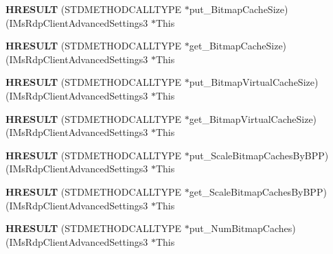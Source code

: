 \begin{DoxyCompactItemize}
{\bfseries H\+R\+E\+S\+U\+LT} (S\+T\+D\+M\+E\+T\+H\+O\+D\+C\+A\+L\+L\+T\+Y\+PE $\ast$put\+\_\+\+Bitmap\+Cache\+Size)(I\+Ms\+Rdp\+Client\+Advanced\+Settings3 $\ast$This
\item 
\mbox{\label{struct_i_ms_rdp_client_advanced_settings3_vtbl_a48b5971f9cb8ebb39366e72e572743e6}} 
{\bfseries H\+R\+E\+S\+U\+LT} (S\+T\+D\+M\+E\+T\+H\+O\+D\+C\+A\+L\+L\+T\+Y\+PE $\ast$get\+\_\+\+Bitmap\+Cache\+Size)(I\+Ms\+Rdp\+Client\+Advanced\+Settings3 $\ast$This
\item 
\mbox{\label{struct_i_ms_rdp_client_advanced_settings3_vtbl_a7ba15eb9a95d8d96d5abe3e9f6d1c70b}} 
{\bfseries H\+R\+E\+S\+U\+LT} (S\+T\+D\+M\+E\+T\+H\+O\+D\+C\+A\+L\+L\+T\+Y\+PE $\ast$put\+\_\+\+Bitmap\+Virtual\+Cache\+Size)(I\+Ms\+Rdp\+Client\+Advanced\+Settings3 $\ast$This
\item 
\mbox{\label{struct_i_ms_rdp_client_advanced_settings3_vtbl_a47dc3fc21077eb0a0d23b28fa47d2a19}} 
{\bfseries H\+R\+E\+S\+U\+LT} (S\+T\+D\+M\+E\+T\+H\+O\+D\+C\+A\+L\+L\+T\+Y\+PE $\ast$get\+\_\+\+Bitmap\+Virtual\+Cache\+Size)(I\+Ms\+Rdp\+Client\+Advanced\+Settings3 $\ast$This
\item 
\mbox{\label{struct_i_ms_rdp_client_advanced_settings3_vtbl_a8caf545c6f0f7c16dba2940960bb2e83}} 
{\bfseries H\+R\+E\+S\+U\+LT} (S\+T\+D\+M\+E\+T\+H\+O\+D\+C\+A\+L\+L\+T\+Y\+PE $\ast$put\+\_\+\+Scale\+Bitmap\+Caches\+By\+B\+PP)(I\+Ms\+Rdp\+Client\+Advanced\+Settings3 $\ast$This
\item 
\mbox{\label{struct_i_ms_rdp_client_advanced_settings3_vtbl_aaefbe7367a5bf2621ff417bcd3383613}} 
{\bfseries H\+R\+E\+S\+U\+LT} (S\+T\+D\+M\+E\+T\+H\+O\+D\+C\+A\+L\+L\+T\+Y\+PE $\ast$get\+\_\+\+Scale\+Bitmap\+Caches\+By\+B\+PP)(I\+Ms\+Rdp\+Client\+Advanced\+Settings3 $\ast$This
\item 
\mbox{\label{struct_i_ms_rdp_client_advanced_settings3_vtbl_a9644b4121d99899c38ababfa9cb2e001}} 
{\bfseries H\+R\+E\+S\+U\+LT} (S\+T\+D\+M\+E\+T\+H\+O\+D\+C\+A\+L\+L\+T\+Y\+PE $\ast$put\+\_\+\+Num\+Bitmap\+Caches)(I\+Ms\+Rdp\+Client\+Advanced\+Settings3 $\ast$This

\end{DoxyCompactItemize}
